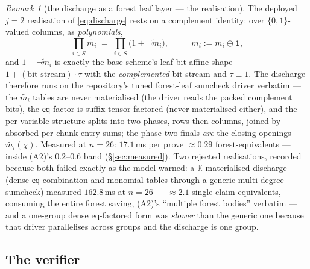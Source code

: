 \documentclass[11pt]{article}
\newcommand{\K}{\mathbb{K}}            %
\newcommand{\bits}{\{0,1\}}
\newcommand{\mle}[1]{\widetilde{#1}}
\newcommand{\eq}{\mathsf{eq}}
\theoremstyle{plain}
\theoremstyle{definition}
\theoremstyle{remark}
\newtheorem{remark}[theorem]{Remark}
\begin{document}
\begin{remark}[the discharge as a forest leaf layer --- the realisation]
\label{rem:dischargeleaf}
The deployed $j=2$ realisation of \eqref{eq:discharge} rests on a
complement identity: over $\bits$-valued columns, as \emph{polynomials},
\[
  \prod_{i\in S}\mle{m_i} \;=\; \prod_{i\in S}\bigl(1+\mle{\lnot m_i}\bigr),
  \qquad \lnot m_i := m_i\oplus\mathbf 1,
\]
and $1+\mle{\lnot m_i}$ is exactly the base scheme's leaf-bit-affine shape
$1 + (\text{bit stream})\cdot\tau$ with the \emph{complemented} bit stream
and $\tau\equiv 1$. The discharge therefore runs on the repository's tuned
forest-leaf sumcheck driver verbatim --- the $\mle{m_i}$ tables are never
materialised (the driver reads the packed complement bits), the $\eq$
factor is suffix-tensor-factored (never materialised either), and the
per-variable structure splits into two phases, rows then columns, joined by
absorbed per-chunk entry sums; the phase-two finals \emph{are} the closing
openings $\mle{m_i}(\chi)$. Measured at $n=26$: $17.1$\,ms per prove
$\approx 0.29$ forest-equivalents --- inside (A2)'s $0.2$--$0.6$ band
(\S\ref{sec:measured}). Two rejected realisations, recorded because both
failed exactly as the model warned: a $\K$-materialised discharge (dense
$\eq$-combination and monomial tables through a generic multi-degree
sumcheck) measured $162.8$\,ms at $n=26$ --- ${\approx}2.1$
single-claim-equivalents, consuming the entire forest saving, (A2)'s
``multiple forest bodies'' verbatim --- and a one-group dense eq-factored
form was \emph{slower} than the generic one because that driver
parallelises across groups and the discharge is one group.
\end{remark}

\subsection{The verifier}\label{sec:verifier}
\end{document}
